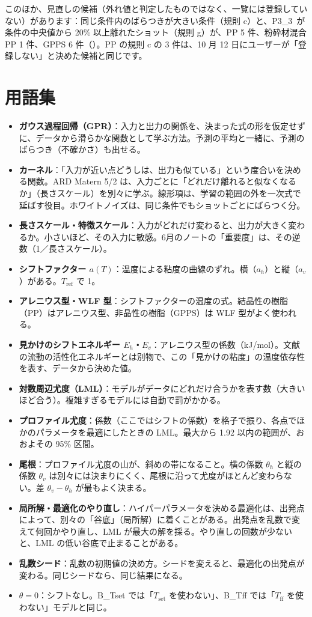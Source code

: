 \documentclass[paper=a4paper,fontsize=10.5pt,line_length=44zw,number_of_lines=38]{jlreq}
\newcommand{\file}[1]{\texttt{\detokenize{#1}}}
\newcommand{\Tff}{T_{\mathrm{ff}}}
\newcommand{\Tset}{T_{\mathrm{set}}}
\newcommand{\Eh}{E_{h}}
\newcommand{\Ev}{E_{v}}
\newcommand{\PIII}{P3\_3}
\newenvironment{termlist}{\begin{itemize}[label=・,leftmargin=1\zw,labelwidth=1\zw,labelsep=0pt,itemsep=0.4ex,topsep=0.6ex,parsep=0pt]}{\end{itemize}}
\newcommand{\term}[1]{\item \textbf{#1}：}
\begin{document}
このほか、見直しの候補（外れ値と判定したものではなく、一覧には登録していない）があります：同じ条件内のばらつきが大きい条件（規則 c）と、\PIII\ が条件の中央値から 20\% 以上離れたショット（規則 g）が、PP 5 件、粉砕材混合 PP 1 件、GPPS 6 件（\file{データ確認/問題の候補.csv}）。PP の規則 c の 3 件は、10 月 12 日にユーザーが「登録しない」と決めた候補と同じです。

\section{用語集}
\begin{termlist}
\term{ガウス過程回帰（GPR）}入力と出力の関係を、決まった式の形を仮定せずに、データから滑らかな関数として学ぶ方法。予測の平均と一緒に、予測のばらつき（不確かさ）も出せる。
\term{カーネル}「入力が近い点どうしは、出力も似ている」という度合いを決める関数。ARD Matern 5/2 は、入力ごとに「どれだけ離れると似なくなるか」（長さスケール）を別々に学ぶ。線形項は、学習の範囲の外を一次式で延ばす役目。ホワイトノイズは、同じ条件でもショットごとにばらつく分。
\term{長さスケール・特徴スケール}入力がどれだけ変わると、出力が大きく変わるか。小さいほど、その入力に敏感。6月のノートの「重要度」は、その逆数（1／長さスケール）。
\term{シフトファクター $a(T)$}温度による粘度の曲線のずれ。横（$a_h$）と縦（$a_v$）がある。$T_{\mathrm{ref}}$ で 1。
\term{アレニウス型・WLF 型}シフトファクターの温度の式。結晶性の樹脂（PP）はアレニウス型、非晶性の樹脂（GPPS）は WLF 型がよく使われる。
\term{見かけのシフトエネルギー $\Eh$・$\Ev$}アレニウス型の係数（kJ/mol）。文献の流動の活性化エネルギーとは別物で、この「見かけの粘度」の温度依存性を表す、データから決めた値。
\term{対数周辺尤度（LML）}モデルがデータにどれだけ合うかを表す数（大きいほど合う）。複雑すぎるモデルには自動で罰がかかる。
\term{プロファイル尤度}係数（ここではシフトの係数）を格子で振り、各点でほかのパラメータを最適にしたときの LML。最大から 1.92 以内の範囲が、おおよその 95\% 区間。
\term{尾根}プロファイル尤度の山が、斜めの帯になること。横の係数 $\theta_h$ と縦の係数 $\theta_v$ は別々には決まりにくく、尾根に沿って尤度がほとんど変わらない。差 $\theta_v-\theta_h$ が最もよく決まる。
\term{局所解・最適化のやり直し}ハイパーパラメータを決める最適化は、出発点によって、別々の「谷底」（局所解）に着くことがある。出発点を乱数で変えて何回かやり直し、LML が最大の解を採る。やり直しの回数が少ないと、LML の低い谷底で止まることがある。
\term{乱数シード}乱数の初期値の決め方。シードを変えると、最適化の出発点が変わる。同じシードなら、同じ結果になる。
\term{$\theta=0$}シフトなし。B\_Tset では「$\Tset$ を使わない」、B\_Tff では「$\Tff$ を使わない」モデルと同じ。

\end{termlist}
\end{document}
